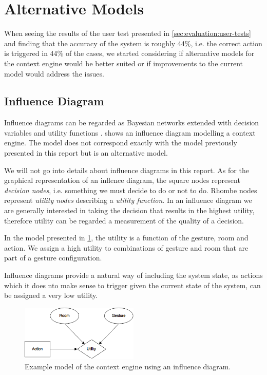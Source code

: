 \section{Alternative Models}
\label{sec:evaluation:alternative-models}

When seeing the results of the user test presented in \cref{sec:evaluation:user-tests} and finding that the accuracy of the system is roughly 44\%, i.e. the correct action is triggered in 44\% of the cases, we started considering if alternative models for the context engine would be better suited or if improvements to the current model would address the issues.

\subsection{Influence Diagram}

Influence diagrams can be regarded as Bayesian networks extended with decision variables and utility functions \cite{kjaerulff2008bayesian}.  shows an influence diagram modelling a context engine. The model does not correspond exactly with the model previously presented in this report but is an alternative model.

We will not go into details about influence diagrams in this report. As for the graphical representation of an inflence diagram, the square nodes represent \emph{decision nodes}, i.e. something we must decide to do or not to do. Rhombe nodes represent \emph{utility nodes} describing a \emph{utility function}. In an influence diagram we are generally interested in taking the decision that results in the highest utility, therefore utility can be regarded a measurement of the quality of a decision.

In the model presented in \cref{fig:evaluation:alternative-models:influence-diagram}, the utility is a function of the gesture, room and action. We assign a high utility to combinations of gesture and room that are part of a gesture configuration. 

Influence diagrams provide a natural way of including the system state, as actions which it does nto make sense to trigger given the current state of the system, can be assigned a very low utility.

\begin{figure}[!h]
\centering
\includegraphics[width=0.50\textwidth]{images/influence-diagram}
\caption{Example model of the context engine using an influence diagram.}
\label{fig:evaluation:alternative-models:influence-diagram}
\end{figure}

